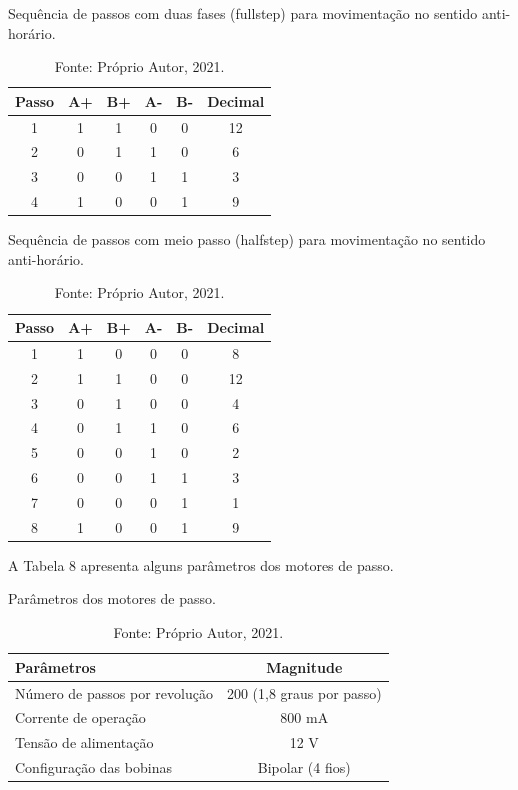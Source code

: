 \begin{table}
    \centering
    \caption{Sequência de passos com duas fases (fullstep) para movimentação no sentido anti-horário.}
    \begin{tabular}{cccccc}
        \hline
        \textbf{Passo} & \textbf{A+} & \textbf{B+} & \textbf{A-} & \textbf{B-} & \textbf{Decimal}\\
        \hline
        1 & 1 & 1 & 0 & 0 & 12\\
        2 & 0 & 1 & 1 & 0 & 6\\
        3 & 0 & 0 & 1 & 1 & 3\\
        4 & 1 & 0 & 0 & 1 & 9\\
        \hline       
    \end{tabular}
    \caption*{Fonte: Próprio Autor, 2021.}
    \label{tab:fullstepantihorario}
\end{table}

\begin{table}
    \centering
    \caption{Sequência de passos com meio passo (halfstep) para movimentação no sentido anti-horário.}
    \begin{tabular}{cccccc}
        \hline
        \textbf{Passo} & \textbf{A+} & \textbf{B+} & \textbf{A-} & \textbf{B-} & \textbf{Decimal}\\
        \hline
        1 & 1 & 0 & 0 & 0 & 8\\
        2 & 1 & 1 & 0 & 0 & 12\\
        3 & 0 & 1 & 0 & 0 & 4\\
        4 & 0 & 1 & 1 & 0 & 6\\
        5 & 0 & 0 & 1 & 0 & 2\\
        6 & 0 & 0 & 1 & 1 & 3\\
        7 & 0 & 0 & 0 & 1 & 1\\
        8 & 1 & 0 & 0 & 1 & 9\\
        \hline       
    \end{tabular}
    \caption*{Fonte: Próprio Autor, 2021.}
    \label{tab:halfstepantihorario}
\end{table}

A Tabela 8 apresenta alguns parâmetros dos motores de passo.

\begin{table}
    \centering
    \caption{Parâmetros dos motores de passo.}
    \begin{tabular}{lc}
        \hline
        \textbf{Parâmetros} & \textbf{Magnitude}\\
        \hline
        Número de passos por revolução & 200 (1,8 graus por passo)\\
        Corrente de operação & 800 mA\\
        Tensão de alimentação & 12 V\\
        Configuração das bobinas & Bipolar (4 fios)\\
        \hline       
    \end{tabular}
    \caption*{Fonte: Próprio Autor, 2021.}
    \label{tab:pmotordepasso}
\end{table}

